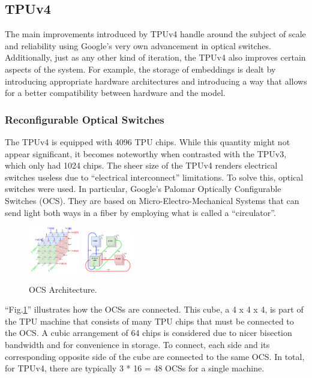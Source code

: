 \subsection{TPUv4}
\label{subsec:tpuv4}
The main improvements introduced by TPUv4 handle around the subject of scale and reliability using Google's very own advancement in optical switches.
Additionally, just as any other kind of iteration, the TPUv4 also improves certain aspects of the system.
For example, the storage of embeddings is dealt by introducing appropriate hardware architectures and introducing a way that allows for a better compatibility between hardware and the model.

\subsubsection{Reconfigurable Optical Switches}
The TPUv4 is equipped with 4096 TPU chips.
While this quantity might not appear significant, it becomes noteworthy when contrasted with the TPUv3, which only had 1024 chips.
The sheer size of the TPUv4 renders electrical switches useless due to ``electrical interconnect'' limitations.
To solve this, optical switches were used.
In particular, Google's Palomar Optically Configurable Switches (OCS).
They are based on Micro-Electro-Mechanical Systems that can send light both ways in a fiber by employing what is called a ``circulator''.

\begin{figure}[htbp!]
    \centerline{\includegraphics[width=0.2\textwidth]{images/tpu_cube}
    \includegraphics[width=0.2\textwidth]{images/tpu_connectivity}}
    \caption{OCS Architecture.}
    \label{fig:ocsarch}
\end{figure}

``Fig.\ref{fig:ocsarch}'' illustrates how the OCSs are connected.
This cube, a 4 x 4 x 4, is part of the TPU machine that consists of many TPU chips that must be connected to the OCS\@.
A cubic arrangement of 64 chips is considered due to nicer bisection bandwidth and for convenience in storage.
To connect, each side and its corresponding opposite side of the cube are connected to the same OCS\@.
In total, for TPUv4, there are typically 3 * 16 = 48 OCSs for a single machine.

